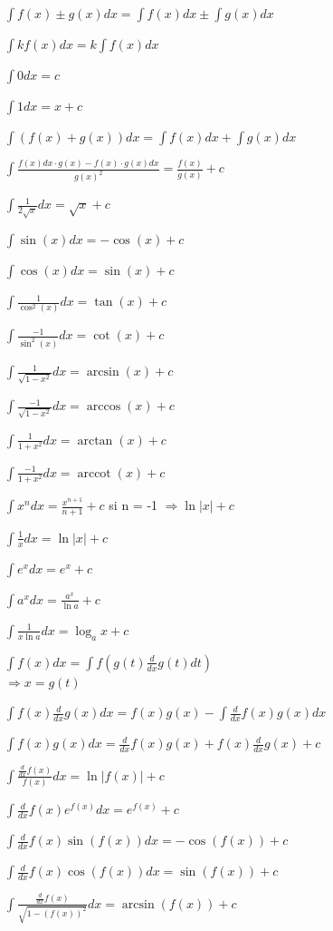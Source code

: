\documentclass[a4paper,12pt]{article}
\newcommand\tab[1][]{\hspace*{#1}}
\DeclareMathOperator{\arccot}{arccot}
\begin{document}
$\int{f(x)\pm g(x)dx}=\int{f(x)dx}\pm \int{g(x)dx}$

$\int{k f(x)dx}= k\int{f(x)dx}$

\vspace{\baselineskip}
$\int{0 dx} = c$

$\int{1 dx} = x +c$

$\int{(f(x)+g(x)) dx} = \int{f(x)dx} + \int{g(x)dx}$

$\int{\frac{f(x)dx \cdot g(x) - f(x) \cdot g(x)dx}{g(x)^2} } = \frac{f(x)}{g(x)} + c$

$\int{\frac{1}{2\sqrt{x}}dx} = \sqrt{x} +c$

$\int{\sin(x)dx} = -\cos(x)+c$

$\int{\cos(x) dx} = \sin(x)+c$

$\int{\frac{1}{\cos^2(x)} dx} = \tan(x) +c$

$\int{\frac{-1}{\sin^2(x)} dx} = \cot(x) +c$

$\int{\frac{1}{\sqrt{1-x^2} } dx} = \arcsin(x) +c$

$\int{\frac{-1}{\sqrt{1-x^2} } dx} = \arccos(x) +c$

$\int{\frac{1}{1+x^2} dx} = \arctan(x) +c$

$\int{\frac{-1}{1+x^2} dx} = \arccot(x) +c$

$\int{x^n dx} = \frac{x^{n+1}}{n+1} +c$
\tab[1cm] si n = -1 $\Rightarrow \ln \left|x\right| +c$

$\int{\frac{1}{x} dx} = \ln \left|x\right| +c$

$\int{e^x dx} = e^x+c$

$\int{a^x dx} = \frac{a^x}{\ln a} +c$

$\int{\frac{1}{x \ln a}  dx} = \log_a x +c$

$\int{f(x) dx} =\int{f(g(t)\frac{d}{dx} g(t)dt)}$\\
\tab[1.8cm]$\Rightarrow x = g(t)$

$\int{f(x) \frac{d}{dx} g(x) dx} = f(x)g(x)-\int{\frac{d}{dx} f(x)g(x) dx}$

$\int{f(x)g(x) dx} = \frac{d}{dx} f(x)g(x) + f(x)\frac{d}{dx} g(x)+c$

$\int{\frac{\frac{d}{dx} f(x)}{f(x)}  dx} = \ln \left|f(x)\right| +c$

$\int{\frac{d}{dx} f(x) e^{f(x)} dx} = e^{f(x)}+c$

$\int{\frac{d}{dx} f(x)\sin(f(x)) dx} = -\cos(f(x)) +c$

$\int{\frac{d}{dx} f(x)\cos(f(x)) dx} = \sin(f(x)) +c$

$\int{\frac{\frac{d}{dx} f(x)}{\sqrt{1-(f(x))^2} }  dx} = \arcsin(f(x)) +c$
\end{document}
